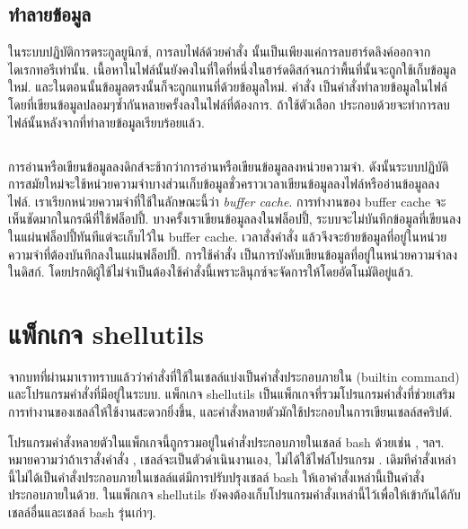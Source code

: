 \begin{thwbr}
\subsection{ทำลายข้อมูล}
ในระบบปฏิบัติการตระกูลยูนิกซ์, การลบไฟล์ด้วยคำสั่ง  นั้นเป็นเพียงแค่การลบฮาร์ดลิงค์ออกจากไดเรกทอรีเท่านั้น. เนื้อหาในไฟล์นั้นยังคงในที่ใดที่หนึ่งในฮาร์ดดิสก์จนกว่าพื้นที่นั้นจะถูกใช้เก็บข้อมูลใหม่. และในตอนนั้นข้อมูลตรงนั้นก็จะถูกแทนที่ด้วยข้อมูลใหม่. คำสั่ง  เป็นคำสั่งทำลายข้อมูลในไฟล์โดยที่เขียนข้อมูลปลอมๆซ้ำกันหลายครั้งลงในไฟล์ที่ต้องการ. ถ้าใช้ตัวเลือก  ประกอบด้วยจะทำการลบไฟล์นั้นหลังจากที่ทำลายข้อมูลเรียบร้อยแล้ว.

\subsection{}
การอ่านหรือเขียนข้อมูลลงดิกส์จะช้ากว่าการอ่านหรือเขียนข้อมูลลงหน่วยความจำ. ดังนั้นระบบปฏิบัติการสมัยใหม่จะใช้หน่วยความจำบางส่วนเก็บข้อมูลชั่วคราวเวลาเขียนข้อมูลลงไฟล์หรืออ่านข้อมูลลงไฟล์. เราเรียกหน่วยความจำที่ใช้ในลักษณะนี้ว่า \emph{buffer cache}. การทำงานของ buffer cache จะเห็นชัดมากในกรณีที่ใช้ฟล็อปปี้. บางครั้งเราเขียนข้อมูลลงในฟล็อปปี้, ระบบจะไม่บันทึกข้อมูลที่เขียนลงในแผ่นฟล็อปปี้ทันทีแต่จะเก็บไว้ใน buffer cache. เวลาสั่งคำสั่ง  แล้วจึงจะย้ายข้อมูลที่อยู่ในหน่วยความจำที่ต้องบันทึกลงในแผ่นฟล็อปปี้. การใช้คำสั่ง  เป็นการบังคับเขียนข้อมูลที่อยู่ในหน่วยความจำลงในดิสก์. โดยปรกติผู้ใช้ไม่จำเป็นต้องใช้คำสั่งนี้เพราะลินุกซ์จะจัดการให้โดยอัตโนมัติอยู่แล้ว.





\section{แพ็กเกจ shellutils}
จากบทที่ผ่านมาเราทราบแล้วว่าคำสั่งที่ใช้ในเชลล์แบ่งเป็นคำสั่งประกอบภายใน (builtin command) และโปรแกรมคำสั่งที่มีอยู่ในระบบ. แพ็กเกจ shellutils เป็นแพ็กเกจที่รวมโปรแกรมคำสั่งที่ช่วยเสริมการทำงานของเชลล์ให้ใช้งานสะดวกยิ่งขึ้น, และคำสั่งหลายตัวมักใช้ประกอบในการเขียนเชลล์สคริปต์. 

โปรแกรมคำสั่งหลายตัวในแพ็กเกจนี้ถูกรวมอยู่ในคำสั่งประกอบภายในเชลล์ bash ด้วยเช่น ,  ฯลฯ. หมายความว่าถ้าเราสั่งคำสั่ง , เชลล์จะเป็นตัวดำเนินงานเอง, ไม่ได้ใช้ไฟล์โปรแกรม . เดิมทีคำสั่งเหล่านี้ไม่ได้เป็นคำสั่งประกอบภายในเชลล์แต่มีการปรับปรุงเชลล์ bash ให้เอาคำสั่งเหล่านี้เป็นคำสั่งประกอบภายในด้วย. ในแพ็กเกจ shellutils ยังคงต้องเก็บโปรแกรมคำสั่งเหล่านี้ไว้เพื่อให้เข้ากันได้กับเชลล์อื่นและเชลล์ bash รุ่นเก่าๆ. 


\end{thwbr}

